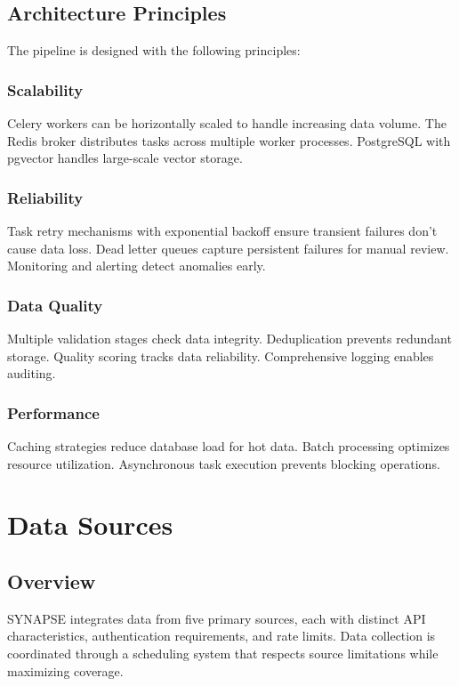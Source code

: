 \documentclass[12pt,a4paper]{report}
\begin{document}
\section{Architecture Principles}

The pipeline is designed with the following principles:

\subsection{Scalability}

Celery workers can be horizontally scaled to handle increasing data volume. The Redis broker distributes tasks across multiple worker processes. PostgreSQL with pgvector handles large-scale vector storage.

\subsection{Reliability}

Task retry mechanisms with exponential backoff ensure transient failures don't cause data loss. Dead letter queues capture persistent failures for manual review. Monitoring and alerting detect anomalies early.

\subsection{Data Quality}

Multiple validation stages check data integrity. Deduplication prevents redundant storage. Quality scoring tracks data reliability. Comprehensive logging enables auditing.

\subsection{Performance}

Caching strategies reduce database load for hot data. Batch processing optimizes resource utilization. Asynchronous task execution prevents blocking operations.

\chapter{Data Sources}

\section{Overview}

SYNAPSE integrates data from five primary sources, each with distinct API characteristics, authentication requirements, and rate limits. Data collection is coordinated through a scheduling system that respects source limitations while maximizing coverage.
\end{document}
